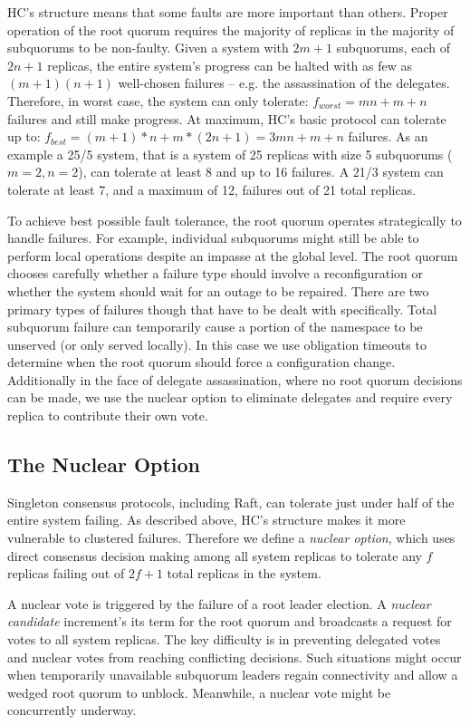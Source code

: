 HC's structure means that some faults are more important than others.
Proper operation of the root quorum requires the majority of replicas in the majority of subquorums to be non-faulty.
Given a system with $2m+1$ subquorums, each of $2n+1$ replicas, the entire system's progress can be halted with as few as $(m+1)(n+1)$ well-chosen failures -- e.g. the assassination of the delegates.
Therefore, in worst case, the system can only tolerate: $f_{worst}=mn+m+n$ failures and still make progress.
At maximum, HC's basic protocol can tolerate up to: $f_{best} = (m+1)*n + m*(2n+1) = 3mn+m+n$ failures.
As an example a 25/5 system, that is a system of 25 replicas with size 5 subquorums ($m=2, n=2$), can tolerate at least 8 and up to 16 failures.
A 21/3 system can tolerate at least 7, and a maximum of 12, failures out of 21 total replicas.

To achieve best possible fault tolerance, the root quorum operates strategically to handle failures.
For example, individual subquorums might still be able to perform local operations despite an impasse at the global level.
The root quorum chooses carefully whether a failure type should involve a reconfiguration or whether the system should wait for an outage to be repaired.
There are two primary types of failures though that have to be dealt with specifically.
Total subquorum failure can temporarily cause a portion of the namespace to be unserved (or only served locally).
In this case we use obligation timeouts to determine when the root quorum should force a configuration change.
Additionally in the face of delegate assassination, where no root quorum decisions can be made, we use the nuclear option to eliminate delegates and require every replica to contribute their own vote.

\subsection{The Nuclear Option}
\label{ch03_nuclear_option}

Singleton consensus protocols, including Raft, can tolerate just under half of the entire system failing.
As described above, HC's structure makes it more vulnerable to clustered failures.
Therefore we define a \emph{nuclear option}, which uses direct consensus decision making among all system replicas to tolerate any $f$ replicas failing out of $2f+1$ total replicas in the system.

A nuclear vote is triggered by the failure of a root leader election.
A \emph{nuclear candidate} increment's its term for the root quorum and broadcasts a request for votes to all system replicas.
The key difficulty is in preventing delegated votes and nuclear votes from reaching conflicting decisions.
Such situations might occur when temporarily unavailable subquorum leaders regain connectivity and allow a wedged root quorum to unblock.
Meanwhile, a nuclear vote might be concurrently underway.

